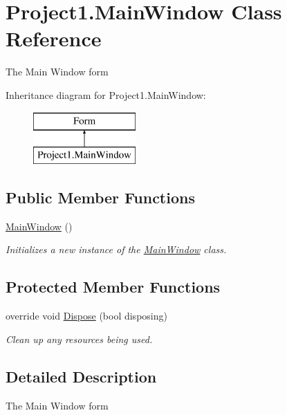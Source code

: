 \hypertarget{class_project1_1_1_main_window}{}\section{Project1.\+Main\+Window Class Reference}
\label{class_project1_1_1_main_window}


The Main Window form  


Inheritance diagram for Project1.\+Main\+Window\+:\begin{figure}[H]
\begin{center}
\leavevmode
\includegraphics[height=2.000000cm]{class_project1_1_1_main_window}
\end{center}
\end{figure}
\subsection*{Public Member Functions}
\begin{DoxyCompactItemize}
\item 
\hyperlink{class_project1_1_1_main_window_ac8ada21cf001233b859c3c8fd34dbd14}{Main\+Window} ()
\begin{DoxyCompactList}\small\item\em Initializes a new instance of the \hyperlink{class_project1_1_1_main_window}{Main\+Window} class. \end{DoxyCompactList}\end{DoxyCompactItemize}
\subsection*{Protected Member Functions}
\begin{DoxyCompactItemize}
\item 
override void \hyperlink{class_project1_1_1_main_window_a6a752bcb31d44385e4f21b1e75861615}{Dispose} (bool disposing)
\begin{DoxyCompactList}\small\item\em Clean up any resources being used. \end{DoxyCompactList}\end{DoxyCompactItemize}


\subsection{Detailed Description}
The Main Window form 

